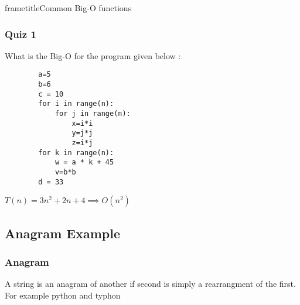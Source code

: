 \documentclass{beamer}
\begin{document}
\begin{frame}
frametitle{Common Big-O functions}

\end{frame}
\begin{frame}[fragile]
    \frametitle{Quiz 1}
    What is the Big-O for the program given below :
    \begin{lstlisting}
        a=5
        b=6
        c = 10
        for i in range(n):
            for j in range(n): 
                x=i*i 
                y=j*j
                z=i*j
        for k in range(n): 
            w = a * k + 45
            v=b*b 
        d = 33
    \end{lstlisting}
    \pause 
    $T(n)  = 3n^{2} + 2n + 4 \implies O(n^{2})$
    
    
\end{frame}
\subsection{Anagram Example}
\begin{frame}
    \frametitle{Anagram}
    \begin{block}
        A string is an anagram of another if second is simply a rearrangment of the first. For example \alert{python} and \alert{typhon}
    \end{block}
    
\end{frame}
\end{document}

